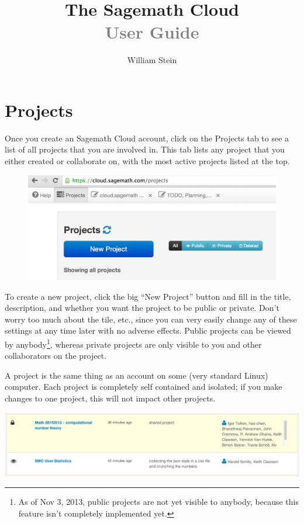 \documentclass{article}
\title{\bf \Huge The Sagemath Cloud\\ \textcolor{gray}{User Guide}}
\author{William Stein}
\begin{document}
\maketitle
\tableofcontents
\newcommand{\smc}{Sagemath Cloud}

\section{Projects}

Once you create an \smc{} account, click on the Projects tab to see a
list of all projects that you are involved in.  This tab lists
any project that you either created or collaborate on, with the
most active projects listed at the top.



\begin{figure}
    \includegraphics[width=.45\textwidth]{pics/project_tab}
\end{figure}
To create a new project, click the big ``New Project'' button and
fill in the title, description, and whether you want the project
to be public or private.  Don't worry too much about the tile, etc.,
since you can very easily change any of these settings at any time
later with no adverse effects.
Public projects can be viewed by anybody\footnote{As of Nov 3, 2013, public projects are not yet
visible to anybody, because this feature isn't completely implemented
yet.},
whereas private projects are only visible to you and
other collaborators on the project.


A project is the same thing as an account on some (very standard
Linux) computer.  Each project is completely self contained and isolated;
if you make changes to one project, this will not impact
other projects.

\begin{center}
\includegraphics[width=.9\textwidth]{pics/projects}
\end{center}
\end{document}
